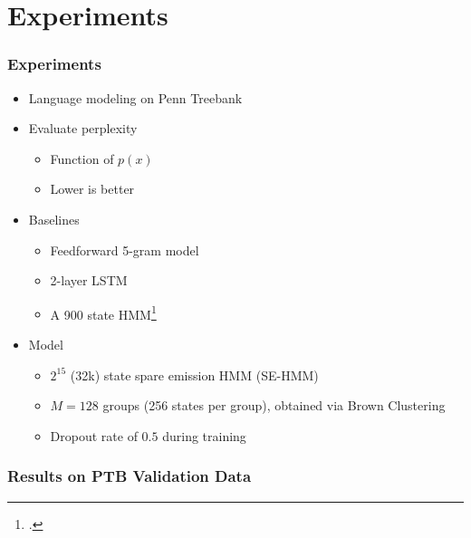 \documentclass{beamer}
\begin{document}
\section{Experiments}
\begin{frame}
\frametitle{Experiments}
\begin{itemize}
\item Language modeling on Penn Treebank
\vspace{1em}
\item Evaluate perplexity
    \begin{itemize}
    \item Function of $p(x)$
    \item Lower is better
    \end{itemize}
\vspace{1em}
\item Baselines
    \begin{itemize}
    \item Feedforward 5-gram model
    \item 2-layer LSTM
    \item A 900 state HMM\footcite{buys2018hmm}
    \end{itemize}
\vspace{1em}
\item Model
    \begin{itemize}
    \item $2^{15}$ (32k) state spare emission HMM (SE-HMM)
    \item $M=128$ groups (256 states per group), obtained via Brown Clustering
    \item Dropout rate of $0.5$ during training
    \end{itemize}
\end{itemize}
\end{frame}

\begin{frame}
\frametitle{Results on PTB Validation Data}
\centering
{}
\end{frame}
\end{document}
